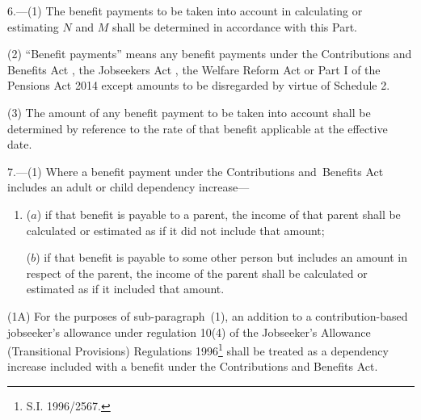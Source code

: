 \documentclass[12pt,a4paper]{article}
\begin{document}
\renewcommand\parthead{--- Schedule 1 Part II}

6.—(1) The benefit payments to be taken into account in calculating or estimating $N$ and $M$ shall be determined in accordance with this Part.

(2) “Benefit payments” means any benefit payments under the Contributions and Benefits Act%
, the Jobseekers Act%
, the Welfare Reform Act or Part I of the Pensions Act 2014  %
except amounts to be disregarded by virtue of Schedule 2.

(3) The amount of any benefit payment to be taken into account shall be determined by reference to the rate of that benefit applicable at the effective date.


\medskip

7.—(1) Where a benefit payment under the Contributions and~Benefits Act includes an adult or child dependency increase—
\begin{enumerate}\item[]
($a$) if that benefit is payable to a parent, the income of that parent shall be calculated or estimated as if it did not include that amount;

($b$) if that benefit is payable to some other person but includes an amount in respect of the parent, the income of the parent shall be calculated or estimated as if it included that amount.
\end{enumerate}

\begin{sloppypar}
(1A) For the purposes of sub-paragraph~(1), an addition to a contribution\hspace{0pt}-\hspace{0pt}based jobseeker’s allowance under 
regulation 10(4)  %
of the Jobseeker’s Allowance (Transitional Provisions) Regulations 
1996\footnote{\frenchspacing S.I. 1996/2567.}  %
shall be treated as a dependency increase included with a benefit under the Contributions and Benefits Act.
\end{sloppypar}
\end{document}
